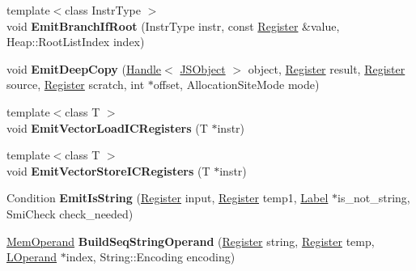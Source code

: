 \begin{DoxyCompactItemize}
\item 
{\footnotesize template$<$class Instr\+Type $>$ }\\void {\bfseries Emit\+Branch\+If\+Root} (Instr\+Type instr, const \hyperlink{structv8_1_1internal_1_1_register}{Register} \&value, Heap\+::\+Root\+List\+Index index)\hypertarget{classv8_1_1internal_1_1_l_code_gen_acbf2ee9931d0e04590b0bba7aa2f133e}{}\label{classv8_1_1internal_1_1_l_code_gen_acbf2ee9931d0e04590b0bba7aa2f133e}

\item 
void {\bfseries Emit\+Deep\+Copy} (\hyperlink{classv8_1_1internal_1_1_handle}{Handle}$<$ \hyperlink{classv8_1_1internal_1_1_j_s_object}{J\+S\+Object} $>$ object, \hyperlink{structv8_1_1internal_1_1_register}{Register} result, \hyperlink{structv8_1_1internal_1_1_register}{Register} source, \hyperlink{structv8_1_1internal_1_1_register}{Register} scratch, int $\ast$offset, Allocation\+Site\+Mode mode)\hypertarget{classv8_1_1internal_1_1_l_code_gen_a2564a4d7948cf555092022de28ffdb7f}{}\label{classv8_1_1internal_1_1_l_code_gen_a2564a4d7948cf555092022de28ffdb7f}

\item 
{\footnotesize template$<$class T $>$ }\\void {\bfseries Emit\+Vector\+Load\+I\+C\+Registers} (T $\ast$instr)\hypertarget{classv8_1_1internal_1_1_l_code_gen_a31e396d22475d9c9dec1ac0e5030380a}{}\label{classv8_1_1internal_1_1_l_code_gen_a31e396d22475d9c9dec1ac0e5030380a}

\item 
{\footnotesize template$<$class T $>$ }\\void {\bfseries Emit\+Vector\+Store\+I\+C\+Registers} (T $\ast$instr)\hypertarget{classv8_1_1internal_1_1_l_code_gen_a84c9b0e87f89361233a5c74e43d689cb}{}\label{classv8_1_1internal_1_1_l_code_gen_a84c9b0e87f89361233a5c74e43d689cb}

\item 
Condition {\bfseries Emit\+Is\+String} (\hyperlink{structv8_1_1internal_1_1_register}{Register} input, \hyperlink{structv8_1_1internal_1_1_register}{Register} temp1, \hyperlink{classv8_1_1internal_1_1_label}{Label} $\ast$is\+\_\+not\+\_\+string, Smi\+Check check\+\_\+needed)\hypertarget{classv8_1_1internal_1_1_l_code_gen_a23c72e27a6bf50a391c940939754673d}{}\label{classv8_1_1internal_1_1_l_code_gen_a23c72e27a6bf50a391c940939754673d}

\item 
\hyperlink{classv8_1_1internal_1_1_mem_operand}{Mem\+Operand} {\bfseries Build\+Seq\+String\+Operand} (\hyperlink{structv8_1_1internal_1_1_register}{Register} string, \hyperlink{structv8_1_1internal_1_1_register}{Register} temp, \hyperlink{classv8_1_1internal_1_1_l_operand}{L\+Operand} $\ast$index, String\+::\+Encoding encoding)\hypertarget{classv8_1_1internal_1_1_l_code_gen_a848c998fe548d9835088862f80e27f49}{}\label{classv8_1_1internal_1_1_l_code_gen_a848c998fe548d9835088862f80e27f49}


\end{DoxyCompactItemize}
